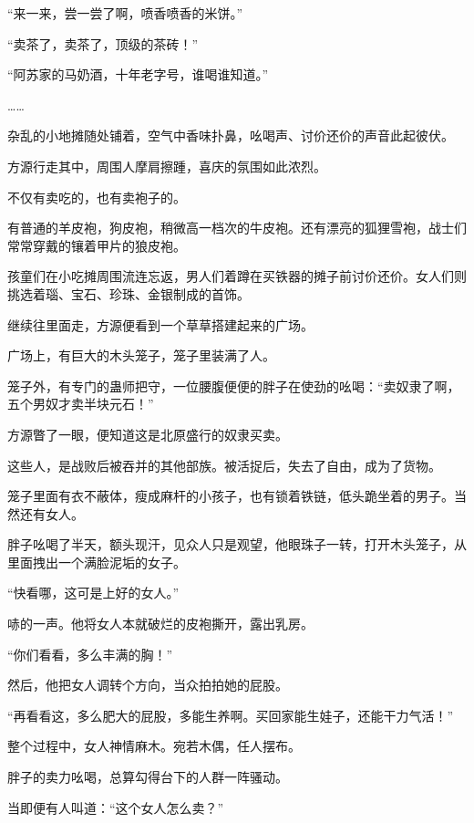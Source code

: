 
\begin{this_body}



“来一来，尝一尝了啊，喷香喷香的米饼。”

“卖茶了，卖茶了，顶级的茶砖！”

“阿苏家的马奶酒，十年老字号，谁喝谁知道。”

……

杂乱的小地摊随处铺着，空气中香味扑鼻，吆喝声、讨价还价的声音此起彼伏。

方源行走其中，周围人摩肩擦踵，喜庆的氛围如此浓烈。

不仅有卖吃的，也有卖袍子的。

有普通的羊皮袍，狗皮袍，稍微高一档次的牛皮袍。还有漂亮的狐狸雪袍，战士们常常穿戴的镶着甲片的狼皮袍。

孩童们在小吃摊周围流连忘返，男人们着蹲在买铁器的摊子前讨价还价。女人们则挑选着瑙、宝石、珍珠、金银制成的首饰。

继续往里面走，方源便看到一个草草搭建起来的广场。

广场上，有巨大的木头笼子，笼子里装满了人。

笼子外，有专门的蛊师把守，一位腰腹便便的胖子在使劲的吆喝：“卖奴隶了啊，五个男奴才卖半块元石！”

方源瞥了一眼，便知道这是北原盛行的奴隶买卖。

这些人，是战败后被吞并的其他部族。被活捉后，失去了自由，成为了货物。

笼子里面有衣不蔽体，瘦成麻杆的小孩子，也有锁着铁链，低头跪坐着的男子。当然还有女人。

胖子吆喝了半天，额头现汗，见众人只是观望，他眼珠子一转，打开木头笼子，从里面拽出一个满脸泥垢的女子。

“快看哪，这可是上好的女人。”

哧的一声。他将女人本就破烂的皮袍撕开，露出乳房。

“你们看看，多么丰满的胸！”

然后，他把女人调转个方向，当众拍拍她的屁股。

“再看看这，多么肥大的屁股，多能生养啊。买回家能生娃子，还能干力气活！”

整个过程中，女人神情麻木。宛若木偶，任人摆布。

胖子的卖力吆喝，总算勾得台下的人群一阵骚动。

当即便有人叫道：“这个女人怎么卖？”


\end{this_body}
